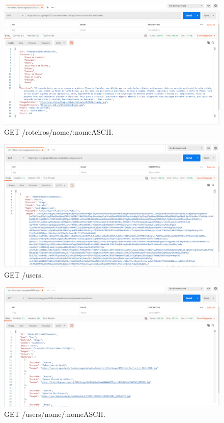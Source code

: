 \begin{figure}[H]
\centering
\includegraphics[width=\linewidth]{images/api_roteiroviana.png}
\caption{GET /roteiros/nome/:nomeASCII.}
\end{figure}

\begin{figure}[H]
\centering
\includegraphics[width=\linewidth]{images/api_user.png}
\caption{GET /users.}
\end{figure}

\begin{figure}[H]
\centering
\includegraphics[width=\linewidth]{images/api_userluk.png}
\caption{GET /users/nome/:nomeASCII.}
\end{figure}